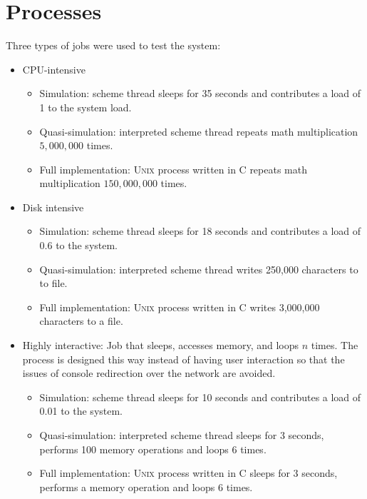 \documentclass{report}
\newcommand{\UNIX}{\textsc{Unix}\xspace}
\begin{document}
\section{Processes}

Three types of jobs were used to test the system: 

    \begin{itemize}
	\item CPU-intensive
	\begin{itemize}
		\item Simulation: scheme thread sleeps for 35 seconds and
	contributes a load of 1 to the system load.
		\item Quasi-simulation: interpreted scheme thread repeats math
	multiplication $5,000,000$ times.
		\item Full implementation: \UNIX process written in C
	repeats math multiplication $150,000,000$ times.
	\end{itemize}

	
	\item Disk intensive
	\begin{itemize}
		\item Simulation: scheme thread sleeps for 18 seconds and
	contributes a load of 0.6 to the system.
		\item Quasi-simulation: interpreted scheme thread writes 
	250,000	characters to to file.
		\item Full implementation: \UNIX process written in C
	writes 3,000,000 characters to a file.
	\end{itemize}


	\item Highly interactive: Job that sleeps, accesses memory, and 
	loops $n$ times.  The process is designed this way instead of having
	user interaction so that the issues of console redirection over the
	network are avoided.
	\begin{itemize}
		\item Simulation: scheme thread sleeps for 10 seconds and
    contributes a load of 0.01 to the system.
		\item Quasi-simulation: interpreted scheme thread sleeps for
    3 seconds, performs 100 memory operations and loops 6 times.
		\item Full implementation: \UNIX process written in C sleeps
    for 3 seconds, performs a memory operation and loops 6 times.
	\end{itemize}

    \end{itemize}
\end{document}
